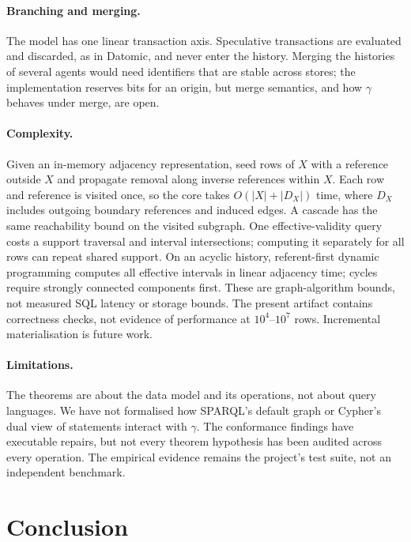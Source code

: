 \documentclass[11pt]{article}
\theoremstyle{plain}
\theoremstyle{definition}
\theoremstyle{remark}
\newcommand{\core}{\gamma}               %
\begin{document}
\paragraph{Branching and merging.} The model has one linear transaction axis.
Speculative transactions are evaluated and discarded, as in Datomic, and never
enter the history. Merging the histories of several agents would need identifiers
that are stable across stores; the implementation reserves bits for an origin, but
merge semantics, and how $\core$ behaves under merge, are open.

\paragraph{Complexity.} Given an in-memory adjacency representation, seed
rows of $X$ with a reference outside $X$ and propagate removal along inverse
references within $X$. Each row and reference is visited once, so the core takes
$O(|X|+|D_X|)$ time, where $D_X$ includes outgoing boundary references and
induced edges. A cascade has the same reachability bound on the visited subgraph.
One effective-validity query costs a support traversal and interval intersections;
computing it separately for all rows can repeat shared support. On an acyclic
history, referent-first dynamic programming computes all effective intervals
in linear adjacency time; cycles require strongly connected components first.
These are graph-algorithm bounds, not measured SQL latency or storage bounds.
The present artifact contains correctness checks, not evidence of performance
at $10^4$--$10^7$ rows. Incremental materialisation is future work.

\paragraph{Limitations.} The theorems are about the data model and its operations,
not about query languages. We have not formalised how SPARQL's default graph or
Cypher's dual view of statements interact with $\core$. The conformance findings
have executable repairs, but not every theorem hypothesis has been audited
across every operation. The empirical evidence remains the project's test suite,
not an independent benchmark.

\section{Conclusion}
\end{document}

